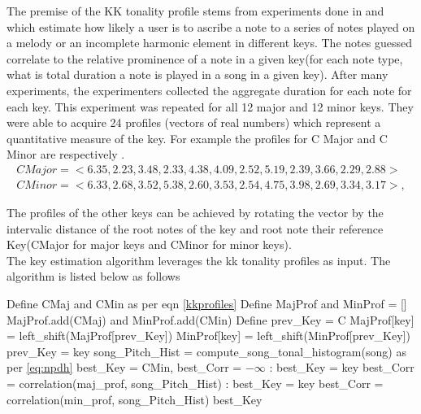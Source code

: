 \noindent The premise of the KK tonality profile stems from experiments done in \cite{kkTonalityKeyFinding} and \cite{kkcognitive} which estimate how likely a user is to ascribe a note to a series of notes played on a melody or an incomplete harmonic element in different keys. The notes guessed correlate to the relative prominence of a note in a given key(for each note type, what is total duration a note is played in a song in a given key). After many experiments, the experimenters collected the aggregate duration for each note for each key. This experiment was  repeated for all 12 major and 12 minor keys. They were able to acquire 24 profiles (vectors of real numbers) which represent a quantitative measure of the key. For example the profiles for C Major and C Minor are respectively \cite{kkcognitive}.
\begin{equation} \label{kkprofiles}
\begin{aligned}
  CMajor = <6.35, 2.23, 3.48, 2.33, 4.38, 4.09, 2.52, 5.19, 2.39, 3.66, 2.29, 2.88> \\
  CMinor = <6.33, 2.68, 3.52, 5.38, 2.60, 3.53, 2.54, 4.75, 3.98, 2.69, 3.34, 3.17>, 
\end{aligned}
\end{equation}

\noindent The profiles of the other keys can be achieved by rotating the vector by the intervalic distance of the root notes of the key and root note their reference Key(CMajor for major keys and CMinor for minor keys). \\

\noindent The key estimation algorithm leverages the kk tonality profiles as input. The algorithm is listed below as follows \cite{kkTonalityKeyFinding}

\begin{algorithm}

\label{CHalgorithm}
\begin{algorithmic}[1]
 {}
\State Define CMaj and CMin as per eqn \ref{kkprofiles}
\State Define MajProf and MinProf = [] %
\State MajProf.add(CMaj) and MinProf.add(CMin)
\State Define prev\_Key = C 
\State MajProf[key] = left\_shift(MajProf[prev\_Key])
\State MinProf[key] = left\_shift(MinProf[prev\_Key])
\State prev\_Key = key
\EndFor
\State song\_Pitch\_Hist = compute\_song\_tonal\_histogram(song) as per \ref{eq:npdh}
\State best\_Key = CMin, best\_Corr = $-\infty$
:
\State best\_Key = key
\State best\_Corr = correlation(maj\_prof, song\_Pitch\_Hist)
\EndIf
\EndFor
{}:
\State best\_Key = key
\State best\_Corr = correlation(min\_prof, song\_Pitch\_Hist)
\EndIf
\EndFor
\Return best\_Key
\EndProcedure
\end{algorithmic}
\end{algorithm}

